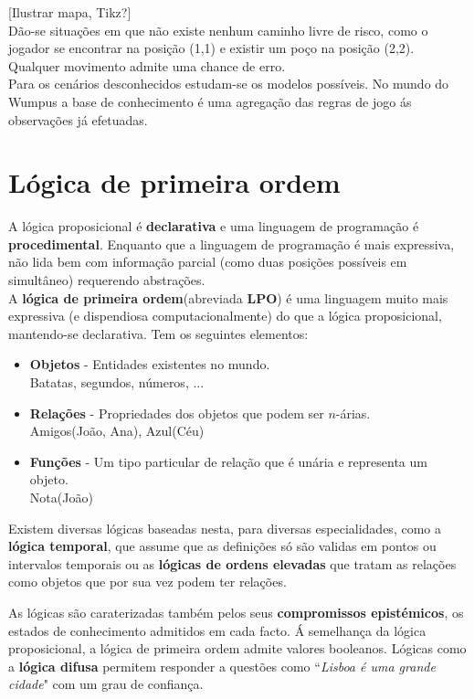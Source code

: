 \documentclass[]{report}
\begin{document}
[Ilustrar mapa, Tikz?]\\[0.5cm]
Dão-se situações em que não existe nenhum caminho livre de risco, como o jogador se encontrar na posição (1,1) e existir um poço na posição (2,2). Qualquer movimento admite uma chance de erro.\\
Para os cenários desconhecidos estudam-se os modelos possíveis.
No mundo do Wumpus a base de conhecimento é uma agregação das regras de jogo ás observações já efetuadas.
\section{Lógica de primeira ordem}
A lógica proposicional é \textbf{declarativa} e uma linguagem de programação é \textbf{procedimental}. Enquanto que a linguagem de programação é mais expressiva, não lida bem com informação parcial (como duas posições possíveis em simultâneo) requerendo abstrações.\\[0.2cm]
A \textbf{lógica de primeira ordem}(abreviada \textbf{LPO}) é uma linguagem muito mais expressiva (e dispendiosa computacionalmente) do que a lógica proposicional, mantendo-se declarativa. Tem os seguintes elementos:
\begin{itemize}
\item \textbf{Objetos} - Entidades existentes no mundo.\\
Batatas, segundos, números, ...
\item \textbf{Relações} - Propriedades dos objetos que podem ser $n$-árias.\\
Amigos(João, Ana), Azul(Céu)
\item \textbf{Funções} - Um tipo particular de relação que é unária e representa um objeto.\\
Nota(João)
\end{itemize}

Existem diversas lógicas baseadas nesta, para diversas especialidades, como a \textbf{lógica temporal}, que assume que as definições só são validas em pontos ou intervalos temporais ou as \textbf{lógicas de ordens elevadas} que tratam as relações como objetos que por sua vez podem ter relações.

As lógicas são caraterizadas também pelos seus \textbf{compromissos epistémicos}, os estados de conhecimento admitidos em cada facto. Á semelhança da lógica proposicional, a lógica de primeira ordem admite valores booleanos. Lógicas como a \textbf{lógica difusa} permitem responder a questões como ``\textit{Lisboa é uma grande cidade}" com um grau de confiança.
\end{document}
